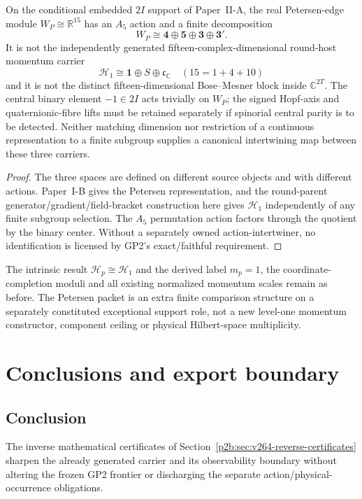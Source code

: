 \documentclass[12pt,a4paper]{article}
\begin{document}
\begin{proposition}
\label{p2b:prop:v318-petersen-vs-h1}
On the conditional embedded $2I$ support of Paper~II-A, the real
Petersen-edge module $W_P\cong\mathbb R^{15}$ has an $A_5$ action and
a finite decomposition
\[
 W_P\cong\mathbf4\oplus\mathbf5\oplus\mathbf3\oplus\mathbf3'.
\]
It is not the independently generated fifteen-complex-dimensional
round-host momentum carrier
\[
 \mathcal H_1\cong\mathbf1\oplus S\oplus\mathfrak c_{\mathbb C}
 \quad(15=1+4+10)
\]
and it is not the distinct fifteen-dimensional Bose--Mesner block
inside $\mathbb C^{2T}$.  The central binary element $-1\in2I$ acts
trivially on $W_P$; the signed Hopf-axis and quaternionic-fibre
lifts must be retained separately if spinorial central parity is to
be detected.  Neither matching dimension nor restriction of a
continuous representation to a finite subgroup supplies a canonical
intertwining map between these three carriers.
\end{proposition}
\begin{proof}
The three spaces are defined on different source objects and with
different actions.  Paper~I-B gives the Petersen representation, and
the round-parent generator/gradient/field-bracket construction here
gives $\mathcal H_1$ independently of any finite subgroup selection.
The $A_5$ permutation action factors through the quotient by the
binary center.  Without a separately owned action-intertwiner, no
identification is licensed by GP2's exact/faithful requirement.
\end{proof}

\begin{remark}
\label{p2b:rem:v318-petersen-momentum-scope}
The intrinsic result $\mathcal H_p\cong\mathcal H_1$ and the derived
label $m_p=1$, the coordinate-completion moduli and all existing
normalized momentum scales remain as before.  The Petersen packet is
an extra finite comparison structure on a separately constituted
exceptional support role, not a new level-one momentum constructor,
component ceiling or physical Hilbert-space multiplicity.
\end{remark}


\section{Conclusions and export boundary}
\subsection{Conclusion}
The inverse mathematical certificates of Section~\ref{p2b:sec:v264-reverse-certificates} sharpen the already generated carrier and its observability boundary without altering the frozen GP2 frontier or discharging the separate action/physical-occurrence obligations.
\end{document}
